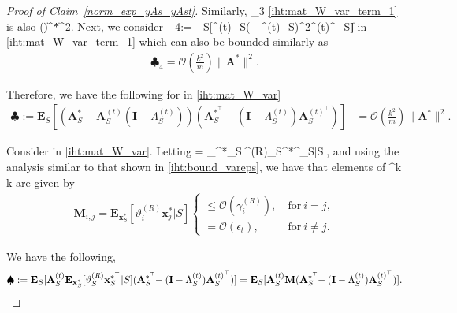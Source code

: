 \documentclass{article}
\def\[#1\]{{$#1$}}
\def\b#1{{\mathbf{#1}}}
\begin{document}
\begin{proof}[Proof of Claim~\ref{norm_exp_yAs_yAst}]
	Similarly, \[\clubsuit_3 \] \eqref{iht:mat_W_var_term_1} is also \[\mathcal{O}()\|\b{A}^*\|^2\]. Next, we consider \[\clubsuit_4:= \|\b{E}_S[\b{A}^{(t)}_S(\b{I} - \Lambda^{(t)}_S)^2\b{A}^{(t)^\top}_S]\|  \] in \eqref{iht:mat_W_var_term_1} which can also be bounded similarly as
	\begin{align*}
	\clubsuit_4 


	=  \mathcal{O}(\tfrac{k^2}{m})\|\b{A}^*\|^2.
	\end{align*}
	
	
	Therefore, we have the following for \[\clubsuit\] in \eqref{iht:mat_W_var} 
	\begin{align}
	\label{iht:mat_W_var_term_1_sim}
	\clubsuit:=\b{E}_S[(\b{A}^*_S  - \b{A}^{(t)}_S(\b{I} - \Lambda^{(t)}_S))(\b{A}^{*^\top}_S  - (\b{I} - \Lambda^{(t)}_S)\b{A}^{(t)^\top}_S)]
	&= \mathcal{O}(\tfrac{k^2}{m})\|\b{A}^*\|^2.
	\end{align}
	
	Consider \[\spadesuit\]  in \eqref{iht:mat_W_var}. Letting \[\b{M} = \b{E}_{\b{x}^*_S}[\vartheta^{(R)}_S\b{x}^{*^\top}_S|S]\], and using the analysis similar to that shown in \ref{iht:bound_vareps}, we have that elements of  \[\b{M} \in {}^{k \times k}\] are given by
		\begin{align*}
	\b{M}_{i,j} =	\b{E}_{\b{x}_S^*}[\vartheta^{(R)}_{i}\b{x}^*_{j}|S] 
		\begin{cases}
		\leq  \mathcal{O}(\gamma^{(R)}_i), & ~\text{for}~ i = j, \\
		 	= \mathcal{O}(\epsilon_t),& ~\text{for}~ i \neq j.
		\end{cases}
		\end{align*}
		
		
    We have the following,
	\begin{align*}
	\spadesuit:= \b{E}_S[\b{A}^{(t)}_S\b{E}_{\b{x}^*_S}[\vartheta^{(R)}_S\b{x}^{*^\top}_S|S](\b{A}^{*^\top}_S  \hspace{-3pt} - (\b{I} - \Lambda^{(t)}_S)\b{A}^{(t)^\top}_S)]  = \b{E}_S[\b{A}^{(t)}_S\b{M}(\b{A}^{*^\top}_S \hspace{-3pt} - (\b{I} - \Lambda^{(t)}_S)\b{A}^{(t)^\top}_S)].
	\end{align*}
	

\end{proof}
\end{document}
